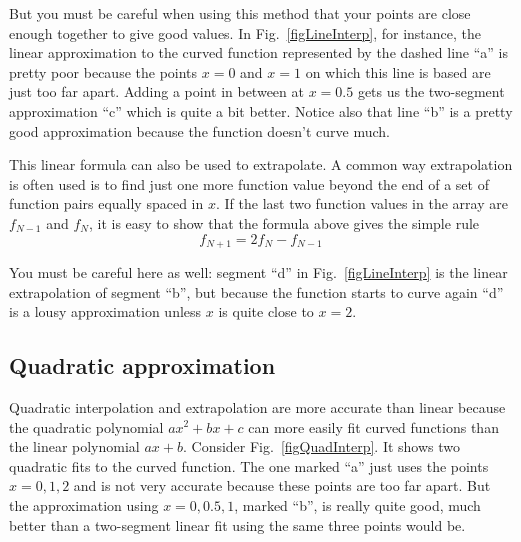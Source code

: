 But you must be careful when using this method that your points are
close enough together to give good values. In
Fig.~\ref{figLineInterp}, for instance, the linear approximation to
the curved function represented by the dashed line ``a'' is pretty
poor because the points $x=0$ and $x=1$ on which this line is based
are just too far apart. Adding a point in between at $x=0.5$ gets
us the two-segment approximation ``c'' which is quite a bit better.
Notice also that line ``b'' is a pretty good approximation because
the function doesn't curve much.

This linear formula can also be used to extrapolate. A common way
extrapolation is often used is to find just one more function value
beyond the end of a set of function pairs equally spaced in $x$. If
the last two function values in the array are $f_{N-1}$ and $f_N$,
it is easy to show that the formula above gives the simple rule
\begin{equation}\label{eq:linExtrap}
f_{N+1} = 2 f_N-f_{N-1}
\end{equation}

You must be careful here as well: segment ``d'' in Fig.~\ref{figLineInterp}
is the linear extrapolation of segment ``b'', but because the
function starts to curve again ``d'' is a lousy approximation unless
$x$ is quite close to $x=2$.



\subsection*{Quadratic approximation}
Quadratic interpolation and extrapolation are more accurate than
linear because the quadratic polynomial $a x^2 + bx + c$ can more
easily fit curved functions than the linear polynomial $ax + b$.
Consider Fig.~\ref{figQuadInterp}. It shows two quadratic fits to the curved
function. The one marked ``a'' just uses the points $x=0,1,2$ and is
not very accurate because these points are too far apart. But the
approximation using $x=0,0.5,1$, marked ``b'', is really quite good,
much better than a two-segment linear fit using the same three
points would be.


